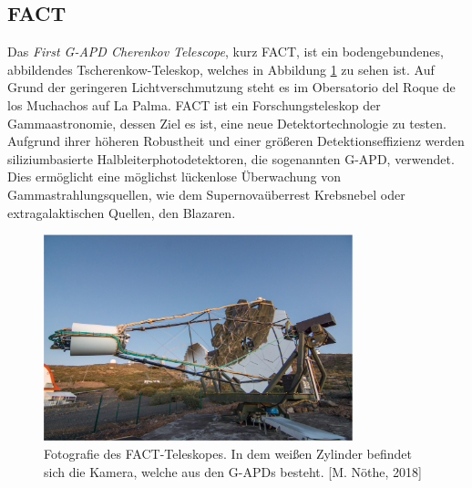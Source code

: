 \subsection{FACT}
Das \textit{First G-APD Cherenkov Telescope}, \cite{Anderhub_2013} kurz FACT, ist ein bodengebundenes, abbildendes Tscherenkow-Teleskop, welches in Abbildung \ref{fig:FACT} zu sehen ist. Auf Grund der geringeren Lichtverschmutzung steht es im Obersatorio del Roque de los Muchachos auf La Palma. FACT ist ein Forschungsteleskop der Gammaastronomie, dessen Ziel es ist, eine neue Detektortechnologie zu testen. Aufgrund ihrer höheren Robustheit und einer größeren Detektionseffizienz werden siliziumbasierte Halbleiterphotodetektoren, die sogenannten G-APD, verwendet. Dies ermöglicht eine möglichst lückenlose Überwachung von Gammastrahlungsquellen, wie dem Supernovaüberrest Krebsnebel oder extragalaktischen Quellen, den Blazaren. \cite{FACTside, Anderhub_2013}
\begin{figure}
  \centering
  \includegraphics[width=0.8\textwidth]{graphics/Max.png}
  \caption{ Fotografie des FACT-Teleskopes. In dem weißen Zylinder befindet sich die Kamera, welche aus den G-APDs besteht. [M. Nöthe, 2018]}
  \label{fig:FACT}
\end{figure}

